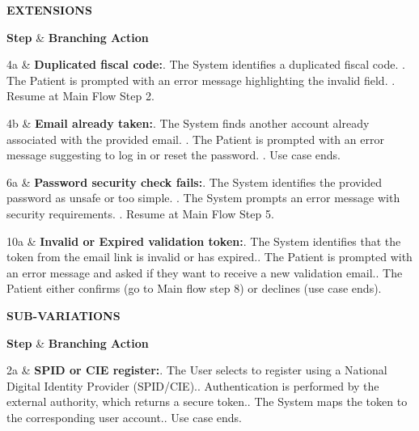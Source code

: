 \documentclass[12pt, a4paper]{article}
\newenvironment{ucextensions}{
    \noindent\textbf{EXTENSIONS} \par \vspace{0.1cm}
    \noindent
    \renewcommand{\arraystretch}{1.3}
    \tabularx{\textwidth}{|>{\centering\arraybackslash}p{1.2cm}|X|}
    \hline
    \rowcolor{gray!30}
    \textbf{Step} & \textbf{Branching Action} \\ \hline
}{
    \endtabularx
    \par\vspace{0.3cm}
}
\newenvironment{ucsubvariations}{
    \noindent\textbf{SUB-VARIATIONS} \par \vspace{0.1cm}
    \noindent
    \renewcommand{\arraystretch}{1.3}
    \tabularx{\textwidth}{|>{\centering\arraybackslash}p{1.2cm}|X|}
    \hline
    \rowcolor{gray!30}
    \textbf{Step} & \textbf{Branching Action} \\ \hline
}{
    \endtabularx
    \par\vspace{0.5cm}
}
\begin{document}
\begin{ucextensions}
    4a & \textbf{Duplicated fiscal code:}. The System identifies a duplicated fiscal code. . The Patient is prompted with an error message highlighting the invalid field. . Resume at Main Flow Step 2. \\ \hline

    4b & \textbf{Email already taken:}. The System finds another account already associated with the provided email. . The Patient is prompted with an error message suggesting to log in or reset the password. . Use case ends. \\ \hline

    6a & \textbf{Password security check fails:}. The System identifies the provided password as unsafe or too simple. . The System prompts an error message with security requirements. . Resume at Main Flow Step 5. \\ \hline

    10a & \textbf{Invalid or Expired validation token:}. The System identifies that the token from the email link is invalid or has expired.. The Patient is prompted with an error message and asked if they want to receive a new validation email.. The Patient either confirms (go to Main flow step 8) or declines (use case ends). \\ \hline
\end{ucextensions}


\begin{ucsubvariations}
    2a & \textbf{SPID or CIE register:}. The User selects to register using a National Digital Identity Provider (SPID/CIE).. Authentication is performed by the external authority, which returns a secure token.. The System maps the token to the corresponding user account.. Use case ends. \\ \hline
\end{ucsubvariations}
\end{document}
